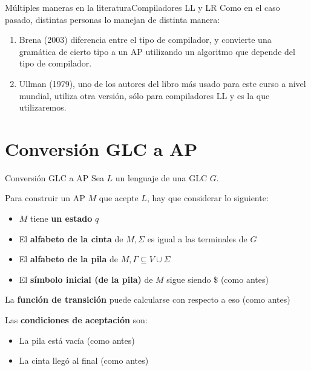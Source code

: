 \documentclass[spanish, handout]{beamer}
\begin{document}
\begin{frame}{Múltiples maneras en la literatura}{Compiladores LL y LR}
    Como en el caso pasado, distintas personas lo manejan de distinta manera:

    \begin{enumerate}
        \itemsep2.5ex
        \item Brena (2003) diferencia entre el tipo de compilador, y convierte una gramática de cierto tipo a un AP utilizando un algoritmo que depende del tipo de compilador. \pause
        \item Ullman (1979), uno de los autores del libro más usado para este curso a nivel mundial, utiliza otra versión, sólo para compiladores LL y es la que utilizaremos.
    \end{enumerate}
\end{frame}

\section{Conversión GLC a AP}

\begin{frame}{Conversión GLC a AP}
    Sea $L$ un lenguaje de una GLC $G$. \pause

    \bigskip

    Para construir un AP $M$ que acepte $L$, hay que considerar lo siguiente: \pause

    \begin{itemize}
        \item $M$ tiene \textbf{un estado} $q$ \pause
        \item El \textbf{alfabeto de la cinta} de $M, \Sigma$ es igual a las terminales de $G$ \pause
        \item El \textbf{alfabeto de la pila}  de $M, \Gamma \subseteq V \cup \Sigma$ \pause
        \item El \textbf{símbolo inicial (de la pila)} de $M$ sigue siendo $\$$ (como antes) \pause
    \end{itemize}

    La \textbf{función de transición} puede calcularse con respecto a eso (como antes) \pause

    \bigskip

    Las \textbf{condiciones de aceptación} son:

    \begin{itemize}
        \item La pila está vacía (como antes) \pause
        \item La cinta llegó al final (como antes)
    \end{itemize}
    
\end{frame}
\end{document}
